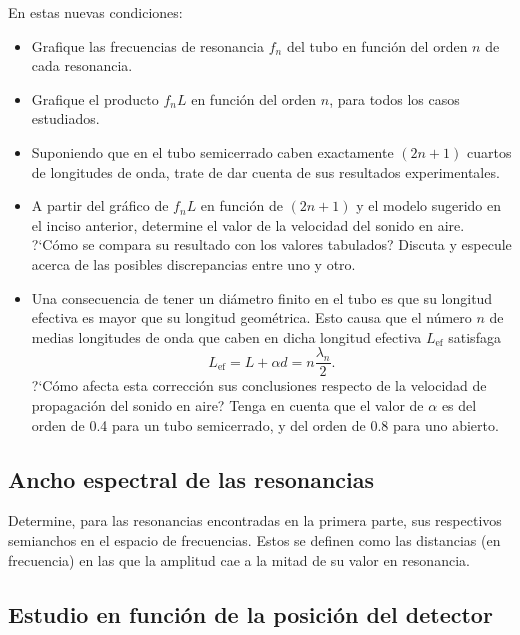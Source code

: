 \documentclass[laboratorio]{guia}
\begin{document}
En estas nuevas condiciones:
\begin{itemize}
    \item Grafique las frecuencias de resonancia $f_n$ del tubo en funci\'on
        del orden $n$ de cada resonancia.
    \item Grafique el producto $f_nL$ en funci\'on del orden $n$, para todos
        los casos estudiados.
    \item Suponiendo que en el tubo semicerrado caben exactamente $(2n+1)$
        cuartos de longitudes de onda, trate de dar cuenta de sus resultados
        experimentales.
    \item A partir del gr\'afico de $f_nL$ en funci\'on de $(2n+1)$ y el modelo
        sugerido en el inciso anterior, determine el valor de la velocidad del
        sonido en aire. ?`C\'omo se compara su resultado con los valores
        tabulados? Discuta y especule acerca de las posibles discrepancias
        entre uno y otro. 
    \item Una consecuencia de tener un di\'ametro finito en el tubo es que su
        longitud efectiva es mayor que su longitud geom\'etrica. Esto causa que
        el n\'umero $n$ de medias longitudes de onda que caben en dicha
        longitud efectiva $L_\text{ef}$ satisfaga
        \begin{equation*}
            L_\text{ef} = L + \alpha d = n \frac{\lambda_n}{2}.
        \end{equation*}
        ?`C\'omo afecta esta correcci\'on sus conclusiones respecto de la
        velocidad de propagaci\'on del sonido en aire? Tenga en cuenta que el valor de $\alpha$ es del
        orden de 0.4 para un tubo semicerrado, y del orden de 0.8 para uno
        abierto.
\end{itemize}

\subsection{Ancho espectral de las resonancias}

Determine, para las resonancias encontradas en la primera parte, sus
respectivos semianchos en el espacio de frecuencias. Estos se definen como las
distancias (en frecuencia) en las que la amplitud cae a la mitad de su valor en
resonancia.

\subsection{Estudio en funci\'on de la posici\'on del detector}
\end{document}
